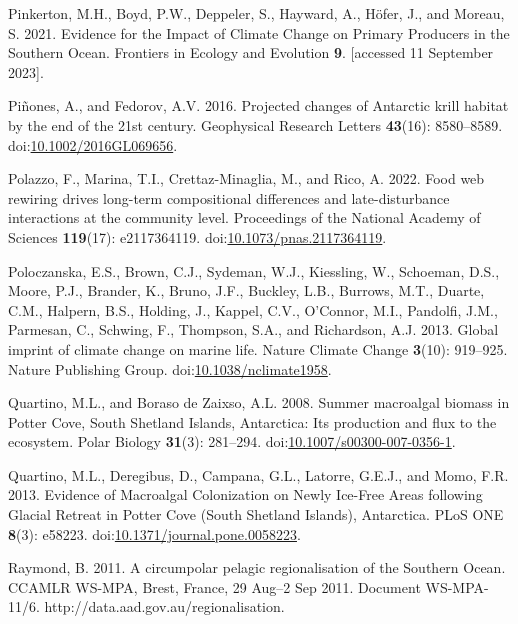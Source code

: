\documentclass[
]{article}
\newlength{\cslhangindent}
\newenvironment{CSLReferences}[2] %
 {\begin{list}{}{%
  \setlength{\itemindent}{0pt}
  \setlength{\leftmargin}{0pt}
  \setlength{\parsep}{0pt}
  \ifodd #1
   \setlength{\leftmargin}{\cslhangindent}
   \setlength{\itemindent}{-1\cslhangindent}
  \fi
  \setlength{\itemsep}{#2\baselineskip}}}
 {\end{list}}
\begin{document}
\begin{CSLReferences}{1}{0}
Pinkerton, M.H., Boyd, P.W., Deppeler, S., Hayward, A., Höfer, J., and
Moreau, S. 2021. Evidence for the {Impact} of {Climate Change} on
{Primary Producers} in the {Southern Ocean}. Frontiers in Ecology and
Evolution \textbf{9}. {[}accessed 11 September 2023{]}.

Piñones, A., and Fedorov, A.V. 2016. Projected changes of {Antarctic}
krill habitat by the end of the 21st century. Geophysical Research
Letters \textbf{43}(16): 8580--8589.
doi:\href{https://doi.org/10.1002/2016GL069656}{10.1002/2016GL069656}.

Polazzo, F., Marina, T.I., Crettaz-Minaglia, M., and Rico, A. 2022. Food
web rewiring drives long-term compositional differences and
late-disturbance interactions at the community level. Proceedings of the
National Academy of Sciences \textbf{119}(17): e2117364119.
doi:\href{https://doi.org/10.1073/pnas.2117364119}{10.1073/pnas.2117364119}.

Poloczanska, E.S., Brown, C.J., Sydeman, W.J., Kiessling, W., Schoeman,
D.S., Moore, P.J., Brander, K., Bruno, J.F., Buckley, L.B., Burrows,
M.T., Duarte, C.M., Halpern, B.S., Holding, J., Kappel, C.V., O'Connor,
M.I., Pandolfi, J.M., Parmesan, C., Schwing, F., Thompson, S.A., and
Richardson, A.J. 2013. Global imprint of climate change on marine life.
Nature Climate Change \textbf{3}(10): 919--925. Nature Publishing Group.
doi:\href{https://doi.org/10.1038/nclimate1958}{10.1038/nclimate1958}.

Quartino, M.L., and Boraso de Zaixso, A.L. 2008. Summer macroalgal
biomass in {Potter Cove}, {South Shetland Islands}, {Antarctica}: Its
production and flux to the ecosystem. Polar Biology \textbf{31}(3):
281--294.
doi:\href{https://doi.org/10.1007/s00300-007-0356-1}{10.1007/s00300-007-0356-1}.

Quartino, M.L., Deregibus, D., Campana, G.L., Latorre, G.E.J., and Momo,
F.R. 2013. Evidence of {Macroalgal Colonization} on {Newly Ice-Free
Areas} following {Glacial Retreat} in {Potter Cove} ({South Shetland
Islands}), {Antarctica}. PLoS ONE \textbf{8}(3): e58223.
doi:\href{https://doi.org/10.1371/journal.pone.0058223}{10.1371/journal.pone.0058223}.

Raymond, B. 2011. A circumpolar pelagic regionalisation of the {Southern
Ocean}. {CCAMLR WS-MPA}, {Brest}, {France}, 29 {Aug}--2 {Sep} 2011.
{Document WS-MPA-11}/6. {http://data.aad.gov.au/regionalisation}.


\end{CSLReferences}
\end{document}
